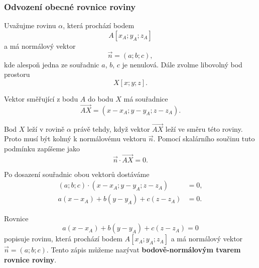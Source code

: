\subsubsection{Odvození obecné rovnice roviny}
\label{subsubsec:Derivation_general_plane_equation}

Uvažujme rovinu $\alpha$, která prochází bodem
\[
    A[x_A;y_A;z_A]
\]
a má normálový vektor
\[
    \vec{n}=(a;b;c),
\]
kde alespoň jedna ze souřadnic $a$, $b$, $c$ je nenulová. Dále zvolme
libovolný bod prostoru
\[
    X[x;y;z].
\]

Vektor směřující z bodu $A$ do bodu $X$ má souřadnice
\[
    \overrightarrow{AX}
    =(x-x_A;y-y_A;z-z_A).
\]

Bod $X$ leží v rovině $\alpha$ právě tehdy, když vektor
$\overrightarrow{AX}$ leží ve směru této roviny. Proto musí být kolmý
k normálovému vektoru $\vec{n}$. Pomocí skalárního součinu tuto podmínku
zapíšeme jako
\begin{equation}
    \vec{n}\cdot\overrightarrow{AX}=0.
    \label{eq:Point_normal_condition_plane}
\end{equation}

Po dosazení souřadnic obou vektorů dostáváme
\begin{align*}
    (a;b;c)\cdot(x-x_A;y-y_A;z-z_A)&=0,\\
    a(x-x_A)+b(y-y_A)+c(z-z_A)&=0.
\end{align*}

Rovnice
\begin{equation}
    a(x-x_A)+b(y-y_A)+c(z-z_A)=0
    \label{eq:Point_normal_plane_equation}
\end{equation}
popisuje rovinu, která prochází bodem $A[x_A;y_A;z_A]$ a má normálový
vektor $\vec{n}=(a;b;c)$. Tento zápis můžeme nazývat
\textbf{bodově-normálovým tvarem rovnice roviny}.

